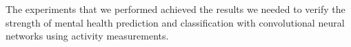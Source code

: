 
The experiments that we performed achieved the results we needed to verify the strength of mental health prediction and classification with convolutional neural networks using activity measurements. 